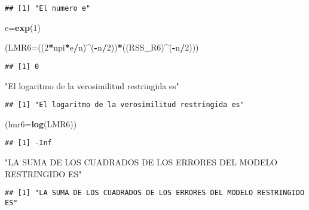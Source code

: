 \documentclass[
]{article}
\newenvironment{Shaded}{\begin{snugshade}}{\end{snugshade}}
\newcommand{\DataTypeTok}[1]{\textcolor[rgb]{0.13,0.29,0.53}{#1}}
\newcommand{\DecValTok}[1]{\textcolor[rgb]{0.00,0.00,0.81}{#1}}
\newcommand{\KeywordTok}[1]{\textcolor[rgb]{0.13,0.29,0.53}{\textbf{#1}}}
\newcommand{\NormalTok}[1]{#1}
\newcommand{\OperatorTok}[1]{\textcolor[rgb]{0.81,0.36,0.00}{\textbf{#1}}}
\newcommand{\StringTok}[1]{\textcolor[rgb]{0.31,0.60,0.02}{#1}}
\begin{document}
\begin{verbatim}
## [1] "El numero e"
\end{verbatim}

\begin{Shaded}
\begin{Highlighting}[]
\NormalTok{e=}\KeywordTok{exp}\NormalTok{(}\DecValTok{1}\NormalTok{)}

\NormalTok{(}\DataTypeTok{LMR6=}\NormalTok{((}\DecValTok{2}\OperatorTok{*}\NormalTok{npi}\OperatorTok{*}\NormalTok{e}\OperatorTok{/}\NormalTok{n)}\OperatorTok{^}\NormalTok{(}\OperatorTok{-}\NormalTok{n}\OperatorTok{/}\DecValTok{2}\NormalTok{))}\OperatorTok{*}\NormalTok{((RSS_R6)}\OperatorTok{^}\NormalTok{(}\OperatorTok{-}\NormalTok{n}\OperatorTok{/}\DecValTok{2}\NormalTok{)))}
\end{Highlighting}
\end{Shaded}

\begin{verbatim}
## [1] 0
\end{verbatim}

\begin{Shaded}
\begin{Highlighting}[]
\StringTok{"El logaritmo de la verosimilitud restringida es"}
\end{Highlighting}
\end{Shaded}

\begin{verbatim}
## [1] "El logaritmo de la verosimilitud restringida es"
\end{verbatim}

\begin{Shaded}
\begin{Highlighting}[]
\NormalTok{(}\DataTypeTok{lmr6=}\KeywordTok{log}\NormalTok{(LMR6))}
\end{Highlighting}
\end{Shaded}

\begin{verbatim}
## [1] -Inf
\end{verbatim}

\begin{Shaded}
\begin{Highlighting}[]
\StringTok{"LA SUMA DE LOS CUADRADOS DE LOS ERRORES DEL MODELO RESTRINGIDO ES"}
\end{Highlighting}
\end{Shaded}

\begin{verbatim}
## [1] "LA SUMA DE LOS CUADRADOS DE LOS ERRORES DEL MODELO RESTRINGIDO ES"
\end{verbatim}
\end{document}
